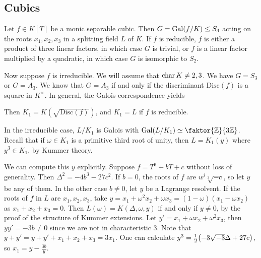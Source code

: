 \subsection{Cubics}
Let \( f \in K[T] \) be a monic separable cubic.
Then \( G = \operatorname{Gal}(f/K) \leq S_3 \) acting on the roots \( x_1, x_2, x_3 \) in a splitting field \( L \) of \( K \).
If \( f \) is reducible, \( f \) is either a product of three linear factors, in which case \( G \) is trivial, or \( f \) is a linear factor multiplied by a quadratic, in which case \( G \) is isomorphic to \( S_2 \).

Now suppose \( f \) is irreducible.
We will assume that \( \operatorname{char} K \neq 2, 3 \).
We have \( G = S_3 \) or \( G = A_3 \).
We know that \( G = A_3 \) if and only if the discriminant \( \mathrm{Disc}(f) \) is a square in \( K^\times \).
In general, the Galois correspondence yields
\begin{center}
\end{center}
Then \( K_1 = K(\sqrt{\mathrm{Disc}(f)}) \), and \( K_1 = L \) if \( f \) is reducible.

In the irreducible case, \( L / K_1 \) is Galois with \( \Gal(L/K_1) \simeq \faktor{\mathbb Z}{3\mathbb Z} \).
Recall that if \( \omega \in K_1 \) is a primitive third root of unity, then \( L = K_1(y) \) where \( y^3 \in K_1 \), by Kummer theory.

We can compute this \( y \) explicitly.
Suppose \( f = T^3 + bT + c \) without loss of generality.
Then \( \Delta^2 = -4b^3 - 27c^2 \).
If \( b = 0 \), the roots of \( f \) are \( w^i \sqrt[3]{-c} \), so let \( y \) be any of them.
In the other case \( b \neq 0 \), let \( y \) be a Lagrange resolvent.
If the roots of \( f \) in \( L \) are \( x_1, x_2, x_3 \), take \( y = x_1 + \omega^2 x_2 + \omega x_3 = (1-\omega)(x_1 - \omega x_2) \) as \( x_1 + x_2 + x_3 = 0 \).
Then \( L(\omega) = K(\Delta, \omega, y) \) if and only if \( y \neq 0 \), by the proof of the structure of Kummer extensions.
Let \( y' = x_1 + \omega x_2 + \omega^2 x_3 \), then \( yy' = -3b \neq 0 \) since we are not in characteristic 3.
Note that \( y + y' = y + y' + x_1 + x_2 + x_3 = 3x_1 \).
One can calculate \( y^3 = \frac{1}{2} \qty(-3\sqrt{-3} \Delta + 27c) \), so \( x_1 = y - \frac{3b}{y} \).

